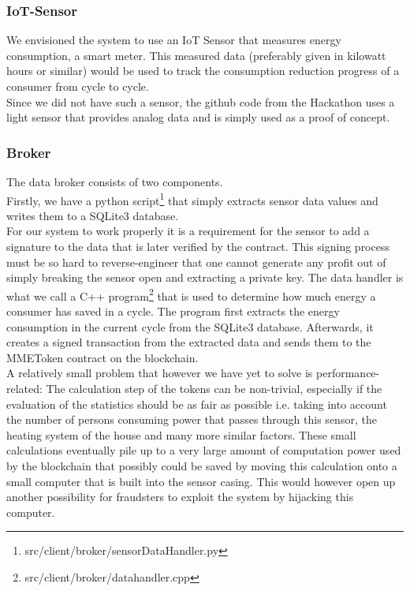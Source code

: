 \documentclass[11pt]{article}
\begin{document}
\subsubsection{IoT-Sensor}
We envisioned the system to use an IoT Sensor that measures energy consumption, a smart meter. This measured data (preferably given in kilowatt hours or similar) would be used to track the consumption reduction progress of a consumer from cycle to cycle. \\
Since we did not have such a sensor, the github code from the Hackathon uses a light sensor that provides analog data and is simply used as a proof of concept.

\subsubsection{Broker}
The data broker consists of two components. \\
Firstly, we have a python script\footnote{src/client/broker/sensorDataHandler.py} that simply extracts sensor data values and writes them to a SQLite3 database. \\
For our system to work properly it is a requirement for the sensor to add a signature to the data that is later verified by the contract. This signing process must be so hard to reverse-engineer that one cannot generate any profit out of simply breaking the sensor open and extracting a private key.
The data handler is what we call a C++ program\footnote{src/client/broker/datahandler.cpp} that is used to determine how much energy a consumer has saved in a cycle. The program first extracts the energy consumption in the current cycle from the SQLite3 database. Afterwards, it creates a signed transaction from the extracted data and sends them to the MMEToken contract on the blockchain.\\
A relatively small problem that however we have yet to solve is performance-related: The calculation step of the tokens can be non-trivial, especially if the evaluation of the statistics should be as fair as possible i.e. taking into account the number of persons consuming power that passes through this sensor, the heating system of the house and many more similar factors. These small calculations eventually pile up to a very large amount of computation power used by the blockchain that possibly could be saved by moving this calculation onto a small computer
that is built into the sensor casing. This would however open up another possibility for fraudsters to exploit the system by hijacking this computer.
\end{document}
